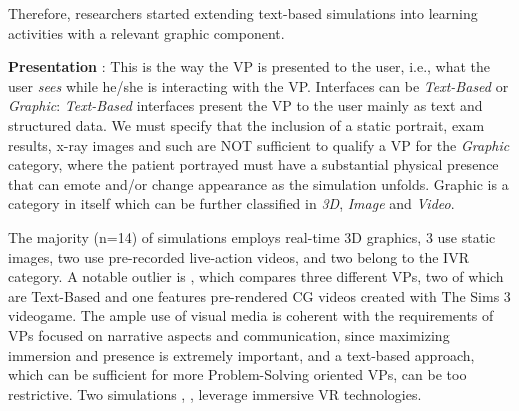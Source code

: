 Therefore, researchers started extending text-based simulations into learning activities with a relevant graphic component. 


\textbf{Presentation }: This is the way the VP is presented to the user, i.e., what the user \emph{sees} while he/she is interacting with the VP. Interfaces can be \emph{Text-Based} or \emph{Graphic}:
\emph{Text-Based} interfaces present the VP to the user mainly as text and structured data. We must specify that the inclusion of a static portrait, exam results, x-ray images and such are NOT sufficient to qualify a VP for the \emph{Graphic} category, where the patient portrayed must have a substantial physical presence that can emote and/or change appearance as the simulation unfolds. Graphic is a category in itself which can be further classified in \emph{3D}, \emph{Image} and \emph{Video}. 

The majority (n=14) of simulations employs real-time 3D graphics, 3 use static images, two use pre-recorded live-action videos, and two belong to the IVR category. A notable outlier is \cite{foster2016using}, which compares three different VPs, two of which are Text-Based and one features pre-rendered CG videos created with The Sims 3 videogame. The ample use of visual media is coherent with the requirements of VPs focused on narrative aspects and communication, since maximizing immersion and presence is extremely important, and a text-based approach, which can be sufficient for more Problem-Solving oriented VPs, can be too restrictive. 
Two simulations \cite{ochs2019training}, \cite{sapkaroski2018implementation}, leverage immersive VR technologies. 




